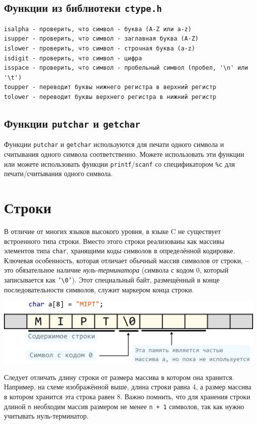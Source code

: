 \documentclass{article}
\begin{document}
\subsection*{Функции из библиотеки \texttt{ctype.h}}
\begin{verbatim}
isalpha - проверить, что символ - буква (A-Z или a-z)
isupper - проверить, что символ - заглавная буква (A-Z)
islower - проверить, что символ - строчная буква (a-z)
isdigit - проверить, что символ - цифра
isspace - проверить, что символ - пробельный символ (пробел, '\n' или '\t')
toupper - переводит буквы нижнего регистра в верхний регистр
tolower - переводит буквы верхнего регистра в нижний регистр
\end{verbatim}


\subsection*{Функции \texttt{putchar} и \texttt{getchar}}
Функции \texttt{putchar} и \texttt{getchar} используются для печати одного символа и считывания одного символа соответственно. Можете использовать эти функции или можете использовать функции \texttt{printf}/\texttt{scanf} со спецификатором \texttt{\%c} для печати/считывания одного символа.


\newpage
\section*{Строки}
В отличие от многих языков высокого уровня, в языке C не существует встроенного типа строки. Вместо этого строки реализованы как массивы элементов типа \texttt{char}, хранящими коды символов в определённой кодировке. Ключевая особенность, которая отличает обычный массив символов от строки, -- это обязательное наличие \textit{нуль-терминатора} (символа с кодом 0, который записывается как \texttt{'\textbackslash 0'}). Этот специальный байт, размещённый в конце последовательности символов, служит маркером конца строки.
\begin{center}
\includegraphics[scale=0.75]{../images/string_in_memory.png}
\end{center}
Следует отличать длину строки от размера массива в котором она хранится. Например, на схеме изображённой выше, длина строки равна 4, а размер массива в котором хранится эта строка равен 8. Важно помнить, что для хранения строки длиной \texttt{n} необходим массив размером не менее \texttt{n + 1} символов, так как нужно учитывать нуль-терминатор.
\end{document}
